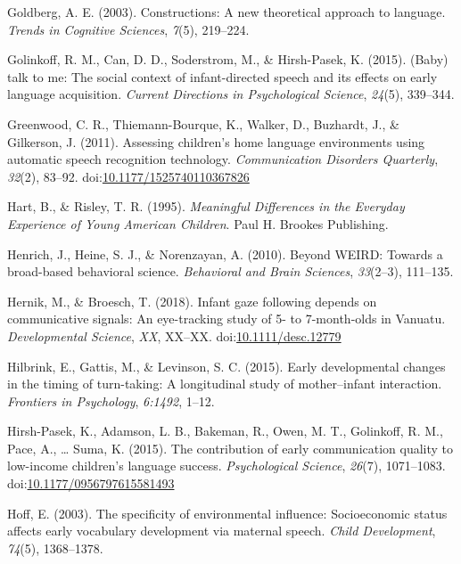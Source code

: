 \documentclass[floatsintext,man]{apa6}
\theoremstyle{definition}
\theoremstyle{definition}
\theoremstyle{definition}
\theoremstyle{remark}
\begin{document}
\hypertarget{ref-goldberg2003constructions}{}
Goldberg, A. E. (2003). Constructions: A new theoretical approach to
language. \emph{Trends in Cognitive Sciences}, \emph{7}(5), 219--224.

\hypertarget{ref-golinkoff2015baby}{}
Golinkoff, R. M., Can, D. D., Soderstrom, M., \& Hirsh-Pasek, K. (2015).
(Baby) talk to me: The social context of infant-directed speech and its
effects on early language acquisition. \emph{Current Directions in
Psychological Science}, \emph{24}(5), 339--344.

\hypertarget{ref-greenwood2011assessing}{}
Greenwood, C. R., Thiemann-Bourque, K., Walker, D., Buzhardt, J., \&
Gilkerson, J. (2011). Assessing children's home language environments
using automatic speech recognition technology. \emph{Communication
Disorders Quarterly}, \emph{32}(2), 83--92.
doi:\href{https://doi.org/10.1177/1525740110367826}{10.1177/1525740110367826}

\hypertarget{ref-hart1995meaningful}{}
Hart, B., \& Risley, T. R. (1995). \emph{Meaningful Differences in the
Everyday Experience of Young American Children}. Paul H. Brookes
Publishing.

\hypertarget{ref-henrich2010beyond}{}
Henrich, J., Heine, S. J., \& Norenzayan, A. (2010). Beyond WEIRD:
Towards a broad-based behavioral science. \emph{Behavioral and Brain
Sciences}, \emph{33}(2--3), 111--135.

\hypertarget{ref-hernik2018infant}{}
Hernik, M., \& Broesch, T. (2018). Infant gaze following depends on
communicative signals: An eye-tracking study of 5- to 7-month-olds in
Vanuatu. \emph{Developmental Science}, \emph{XX}, XX--XX.
doi:\href{https://doi.org/10.1111/desc.12779}{10.1111/desc.12779}

\hypertarget{ref-hilbrink2015early}{}
Hilbrink, E., Gattis, M., \& Levinson, S. C. (2015). Early developmental
changes in the timing of turn-taking: A longitudinal study of
mother--infant interaction. \emph{Frontiers in Psychology},
\emph{6:1492}, 1--12.

\hypertarget{ref-hirshpasek2015contribution}{}
Hirsh-Pasek, K., Adamson, L. B., Bakeman, R., Owen, M. T., Golinkoff, R.
M., Pace, A., \ldots{} Suma, K. (2015). The contribution of early
communication quality to low-income children's language success.
\emph{Psychological Science}, \emph{26}(7), 1071--1083.
doi:\href{https://doi.org/10.1177/0956797615581493}{10.1177/0956797615581493}

\hypertarget{ref-hoff2003specificity}{}
Hoff, E. (2003). The specificity of environmental influence:
Socioeconomic status affects early vocabulary development via maternal
speech. \emph{Child Development}, \emph{74}(5), 1368--1378.
\end{document}

